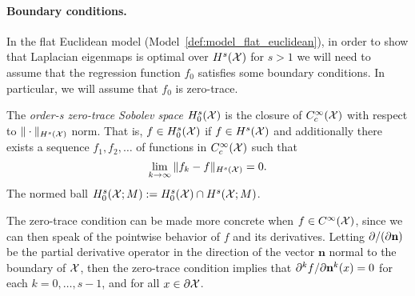 \paragraph{Boundary conditions.}
In the flat Euclidean model (Model~\ref{def:model_flat_euclidean}), in order to show that Laplacian eigenmaps is optimal over $H^{s}(\mathcal{X})$ for $s > 1$ we will need to assume that the regression function $f_0$ satisfies some boundary conditions. In particular, we will assume that $f_0$ is zero-trace.
\begin{definition}
	\label{def:zero_trace_sobolev_space}
	The \emph{order-s zero-trace Sobolev space} $H_0^s(\mathcal{X})$ is the closure of $C_c^\infty(\mathcal{X})$ with respect to $\|\cdot\|_{H^s(\mathcal{X})}$ norm. That is, $f \in H_0^s(\mathcal{X})$ if $f \in H^s(\mathcal{X})$ and additionally there exists a sequence $f_1,f_2,\ldots$ of functions in $C_c^{\infty}(\mathcal{X})$ such that
	\begin{equation*}
	\lim_{k \to \infty}\|f_k - f\|_{H^s(\mathcal{X})} = 0.
	\end{equation*}
	The normed ball $H_0^{s}(\mathcal{X};M) := H_0^{s}(\mathcal{X}) \cap H^{s}(\mathcal{X};M)$.
\end{definition}
The zero-trace condition can be made more concrete when $f \in C^\infty(\mathcal{X})$, since we can then speak of the pointwise behavior of $f$ and its derivatives. Letting $\partial/(\partial {\bf n})$ be the partial derivative operator in the direction of the vector $\mathbf{n}$ normal to the boundary of $\mathcal{X}$, then the zero-trace condition implies that $\partial^{k}f/\partial{\bf n}^k(x) = 0$ for each $k = 0,\ldots,s - 1$, and for all $x \in \partial\mathcal{X}$.


